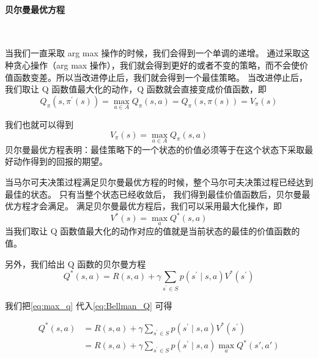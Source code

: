 \paragraph{贝尔曼最优方程}~{}
\newline



当我们一直采取 arg max 操作的时候，我们会得到一个单调的递增。
通过采取这种贪心操作（arg max 操作），我们就会得到更好的或者不变的策略，而不会使价值函数变差。所以当改进停止后，我们就会得到一个最佳策略。
当改进停止后，我们取让 Q 函数值最大化的动作，Q 函数就会直接变成价值函数，即
\begin{equation}
  Q_{\pi}\left(s, \pi^{\prime}(s)\right)=\max _{a \in A} Q_{\pi}(s, a)=Q_{\pi}(s, \pi(s))=V_{\pi}(s)
  \label{eq:}
\end{equation}

我们也就可以得到
\begin{equation}
  V_{\pi}(s)=\max _{a \in A} Q_{\pi}(s, a)
  \label{eq:boe}
\end{equation}
贝尔曼最优方程表明：最佳策略下的一个状态的价值必须等于在这个状态下采取最好动作得到的回报的期望。 

当马尔可夫决策过程满足贝尔曼最优方程的时候，整个马尔可夫决策过程已经达到最佳的状态。
只有当整个状态已经收敛后，
我们得到最佳价值函数后，贝尔曼最优方程才会满足。
满足贝尔曼最优方程后，我们可以采用最大化操作，即
\begin{equation}
  V^{*}(s)=\max _{a} Q^{*}(s, a)
  \label{eq:max_q}
\end{equation}
当我们取让 Q 函数值最大化的动作对应的值就是当前状态的最佳的价值函数的值。

另外，我们给出 Q 函数的贝尔曼方程
\begin{equation}
  Q^{*}(s, a)=R(s, a)+\gamma \sum_{s^{\prime} \in S} p\left(s^{\prime} \mid s, a\right) V^{*}\left(s^{\prime}\right)
  \label{eq:Bellman_Q}
\end{equation}

我们把\eqref{eq:max_q} 代入\eqref{eq:Bellman_Q} 可得

\begin{equation}
  \begin{aligned}
    Q^{*}(s, a)&=R(s, a)+\gamma \sum_{s^{\prime} \in S} p\left(s^{\prime} \mid s, a\right) V^{*}\left(s^{\prime}\right) \\
    &=R(s,a)+\gamma \sum_{s^{\prime} \in S} p\left(s^{\prime} \mid s, a\right) \max _{a} Q^{*}(s', a')
    \end{aligned}
  \label{eq:Q_transfer}
\end{equation}

